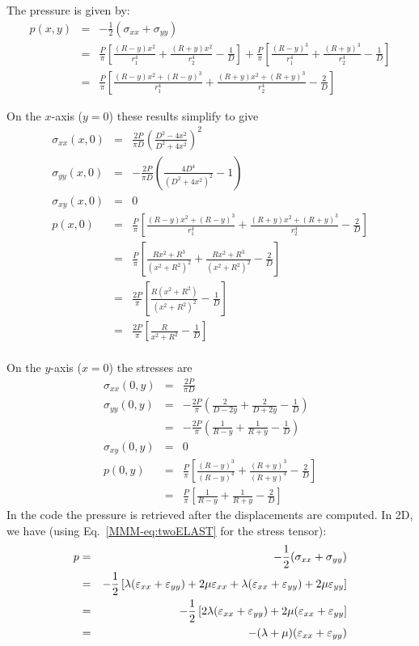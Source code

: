 The pressure is given by:
\begin{eqnarray}
p(x,y) 
&=& -\frac{1}{2}(\sigma_{xx} + \sigma_{yy}) \nonumber\\
&=& 
 \frac{P}{\pi} \left[ \frac{(R-y)x^2}{r_1^4} + \frac{(R+y)x^2}{r_2^4} -\frac{1}{D} \right] 
+ \frac{P}{\pi} \left[ \frac{(R-y)^3}{r_1^4} + \frac{(R+y)^3}{r_2^4} -\frac{1}{D} \right] \\
&=& 
\frac{P}{\pi} \left[ \frac{(R-y)x^2 + (R-y)^3 }{r_1^4} + \frac{(R+y)x^2 + (R+y)^3}{r_2^4} - \frac{2}{D}\right] 
\end{eqnarray}

On the $x$-axis ($y=0$) these results simplify to give
\begin{eqnarray}
\sigma_{xx}(x,0) &=& \frac{2P}{\pi D} \left( \frac{D^2-4x^2}{D^2+4x^2}  \right)^2 \\
\sigma_{yy}(x,0) &=& -\frac{2P}{\pi D} \left( \frac{4D^4}{(D^2+4x^2)^2} -1 \right) \\
\sigma_{xy}(x,0) &=& 0 \\
p(x,0) 
&=& \frac{P}{\pi} \left[ \frac{(R-y)x^2 + (R-y)^3 }{r_1^4} + \frac{(R+y)x^2 + (R+y)^3  }{r_2^4}  - \frac{2}{D} \right] \\
&=& \frac{P}{\pi} \left[ \frac{Rx^2 + R^3 }{(x^2+R^2)^2} + \frac{Rx^2 + R^3  }{(x^2+R^2)^2}  - \frac{2}{D} \right] \\
&=& \frac{2P}{\pi} \left[ \frac{R(x^2 + R^2 )}{(x^2+R^2)^2} - \frac{1}{D} \right] \\
&=& \frac{2P}{\pi} \left[ \frac{R }{x^2+R^2} - \frac{1}{D} \right] \\
\end{eqnarray}

On the $y$-axis ($x=0$) the stresses are 
\begin{eqnarray}
\sigma_{xx}(0,y) &=& \frac{2P}{\pi D} \\
\sigma_{yy}(0,y) 
&=& -\frac{2P}{\pi} \left( \frac{2}{D-2y} + \frac{2}{D+2y} -\frac{1}{D} \right) \\
&=& -\frac{2P}{\pi} \left( \frac{1}{R-y} + \frac{1}{R+y} -\frac{1}{D} \right) \\
\sigma_{xy} (0,y) &=& 0 \\
p(0,y) 
&=& \frac{P}{\pi} \left[ \frac{(R-y)^3 }{(R-y)^4} + \frac{ (R+y)^3  }{(R+y)^4}  - \frac{2}{D} \right] \\
&=& \frac{P}{\pi} \left[ \frac{1}{R-y} + \frac{ 1 }{R+y}  - \frac{2}{D} \right] 
\end{eqnarray}
In the code the pressure is retrieved after the displacements are computed. 
In 2D, we have (using Eq.~\ref{MMM-eq:twoELAST} for the stress tensor):
\begin{eqnarray}
p
&=& -\frac{1}{2}(\sigma_{xx} + \sigma_{yy}) \nonumber\\
&=& -\frac{1}{2} \left[
\lambda (\varepsilon_{xx}+\varepsilon_{yy}) + 2 \mu \varepsilon_{xx} +
\lambda (\varepsilon_{xx}+\varepsilon_{yy}) + 2 \mu \varepsilon_{yy} 
\right] \\
&=& -\frac{1}{2} \left[
2\lambda (\varepsilon_{xx}+\varepsilon_{yy}) + 2 \mu (\varepsilon_{xx} + \varepsilon_{yy} \right]\nonumber\\
&=& -(\lambda+\mu) (\varepsilon_{xx}+\varepsilon_{yy}) 
\end{eqnarray}

